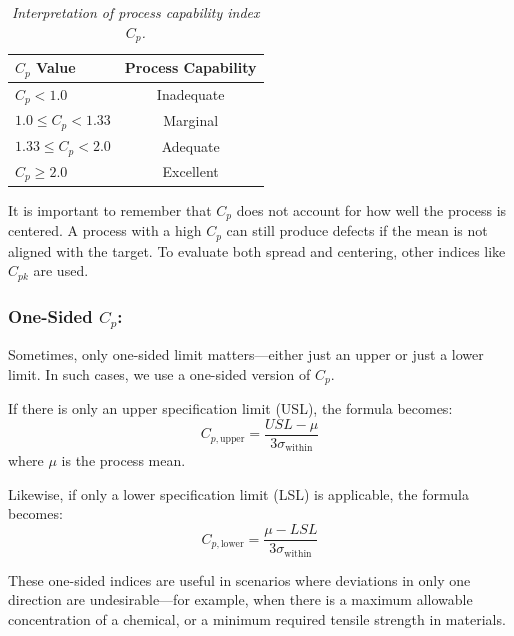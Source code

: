 \documentclass[twoside]{book}
\begin{document}
\begin{table}[H]
\centering
\begin{tabular}{l|c}
\toprule
\textbf{$C_{p}$ Value} & \textbf{Process Capability} \\
\midrule
$C_{p} < 1.0$ & Inadequate \\
$1.0 \leq C_{p} < 1.33$ & Marginal \\
$1.33 \leq C_{p} < 2.0$ & Adequate \\
$C_{p} \geq 2.0$ & Excellent \\
\bottomrule
\end{tabular}
\caption{\textit{Interpretation of process capability index $C_{p}$.}}
\end{table}

It is important to remember that $C_p$ does not account for how well the process is centered. A process with a high $C_p$ can still produce defects if the mean is not aligned with the target. To evaluate both spread and centering, other indices like $C_{pk}$ are used.

%

\subsubsection{One-Sided $C_{p}$:}

Sometimes, only one-sided limit matters—either just an upper or just a lower limit. In such cases, we use a one-sided version of \( C_{p} \).

If there is only an upper specification limit (USL), the formula becomes:
\[
C_{p, \text{upper}} = \frac{USL - \mu}{3\sigma_{\text{within}}}
\]
where $\mu$ is the process mean.

Likewise, if only a lower specification limit (LSL) is applicable, the formula becomes:
\[
C_{p, \text{lower}} = \frac{\mu - LSL}{3\sigma_{\text{within}}}
\]

These one-sided indices are useful in scenarios where deviations in only one direction are undesirable—for example, when there is a maximum allowable concentration of a chemical, or a minimum required tensile strength in materials.
\end{document}
